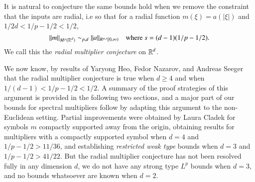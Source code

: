 

It is natural to conjecture the same bounds hold when we remove the constraint that the inputs are radial, i.e so that for a radial function $m(\xi) = a(|\xi|)$ and $1/2d < 1/p - 1/2 < 1/2$,
%
\begin{equation} \label{RadialMultiplierBound}
  \| m \|_{M^p(\operatorname{\mathbb{R}}^d)} \sim_{p,d} \| a \|_{R^{p,s}[0,\infty)} \quad\text{where $s = (d-1)(1/p - 1/2)$}.
\end{equation}
%
%
%
We call this the \emph{radial multiplier conjecture} on $\operatorname{\mathbb{R}}^d$.

We now know, by results of Yaryong Heo, Fedor Nazarov, and Andreas Seeger \cite{HeoandNazarovandSeeger} that the radial multiplier conjecture is true when $d \geq 4$ and when $1/(d-1) < 1/p - 1/2 < 1/2$. A summary of the proof strategies of this argument is provided in the following two sections, and a major part of our bounds for spectral multipliers follow by adapting this argument to the non-Euclidean setting. Partial improvements were obtained by Laura Cladek \cite{Cladek} for symbols $m$ compactly supported away from the origin, obtaining results for multipliers with a compactly supported symbol when $d = 4$ and $1/p - 1/2 > 11/36$, and establishing \emph{restricted weak type} bounds when $d = 3$ and $1/p - 1/2 > 41/22$. But the radial multiplier conjecture has not been resolved fully in any dimension $d$, we do not have any strong type $L^p$ bounds when $d = 3$, and no bounds whatsoever are known when $d = 2$.

